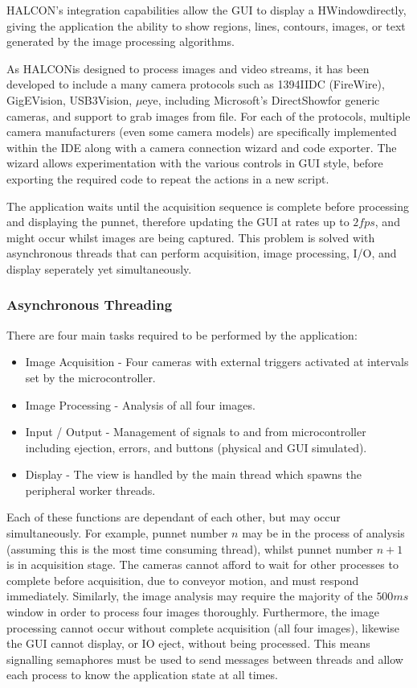 \documentclass[fleqn,twoside,12pt]{report}
\begin{document}
  
HALCON\texttrademark's integration capabilities allow the GUI to display a HWindow\texttrademark directly, giving the application the ability to show regions, lines, contours, images, or text generated by the image processing algorithms. 

As HALCON\texttrademark is designed to process images and video streams, it has been developed to include a many camera protocols such as 1394IIDC (FireWire\texttrademark), GigEVision\textregistered, USB3Vision\textregistered, $\mu$eye\texttrademark, including Microsoft\textregistered's DirectShow\textregistered for generic cameras, and support to grab images from file. For each of the protocols, multiple camera manufacturers (even some camera models) are specifically implemented within the IDE along with a camera connection wizard and code exporter. The wizard allows experimentation with the various controls in GUI style, before exporting the required code to repeat the actions in a new script. 

The application waits until the acquisition sequence is complete before processing and displaying the punnet, therefore updating the GUI at rates up to $2fps$, and might occur whilst images are being captured. This problem is solved with asynchronous threads that can perform acquisition, image processing, I/O, and display seperately yet simultaneously.


\subsubsection{Asynchronous Threading}

There are four main tasks required to be performed by the application:


\begin{itemize}
	\item Image Acquisition - Four cameras with external triggers activated at intervals set by the microcontroller.
	\item Image Processing - Analysis of all four images.
	\item Input / Output - Management of signals to and from microcontroller including ejection, errors, and buttons (physical and GUI simulated).
	\item Display - The view is handled by the main thread which spawns the peripheral worker threads.
\end{itemize}


Each of these functions are dependant of each other, but may occur simultaneously. For example, punnet number $n$ may be in the process of analysis (assuming this is the most time consuming thread), whilst punnet number $n+1$ is in acquisition stage. The cameras cannot afford to wait for other processes to complete before acquisition, due to conveyor motion, and must respond immediately. Similarly, the image analysis may require the majority of the $500ms$ window in order to process four images thoroughly. Furthermore, the image processing cannot occur without complete acquisition (all four images), likewise the GUI cannot display, or IO eject, without being processed. This means signalling semaphores must be used to send messages between threads and allow each process to know the application state at all times.
\end{document}
